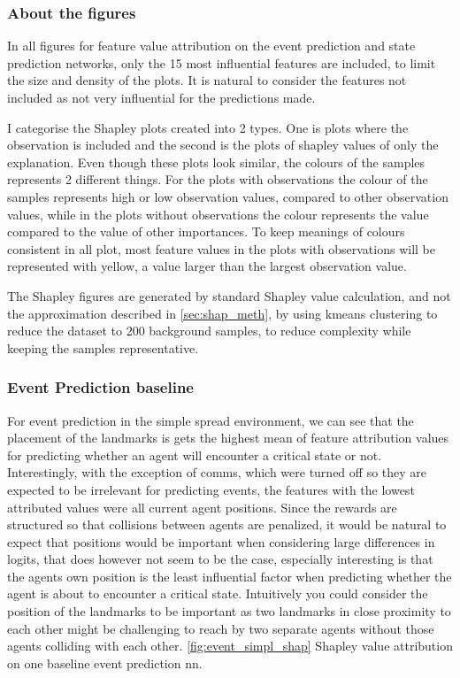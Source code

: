 \documentclass[UKenglish]{uiomasterthesis}
\begin{document}
\subsubsection{About the figures}
In all figures for feature value attribution on the event prediction and state prediction networks, only the 15 most influential features are included, to limit the size and density of the plots. It is natural to consider the features not included as not very influential for the predictions made.

I categorise the Shapley plots created into 2 types. One is plots where the observation is included and the second is the plots of shapley values of only the explanation. Even though these plots look similar, the colours of the samples represents 2 different things. For the plots with observations the colour of the samples represents high or low observation values, compared to other observation values, while in the plots without observations the colour represents the value compared to the value of other importances. To keep meanings of colours consistent in all plot, most feature values in the plots with observations will be represented with yellow, a value larger than the largest observation value.

The Shapley figures are generated by standard Shapley value calculation, and not the approximation described in \cref{sec:shap_meth}, by using kmeans clustering to reduce the dataset to 200 background samples, to reduce complexity while keeping the samples representative. \cite{cshap}

\subsubsection{Event Prediction baseline}
For event prediction in the simple spread environment, we can see that the placement of the landmarks is gets the highest mean of feature attribution values for predicting whether an agent will encounter a critical state or not. Interestingly, with the exception of comms, which were turned off so they are expected to be irrelevant for predicting events, the features with the lowest attributed values were all current agent positions. Since the rewards are structured so that collisions between agents are penalized, it would be natural to expect that positions would be important when considering large differences in logits, that does however not seem to be the case, especially interesting is that the agents own position is the least influential factor when predicting whether the agent is about to encounter a critical state. Intuitively you could consider the position of the landmarks to be important as two landmarks in close proximity to each other might be challenging to reach by two separate agents without those agents colliding with each other. \cref{fig:event_simpl_shap} Shapley value attribution on one baseline event prediction \ac{nn}.
\end{document}

